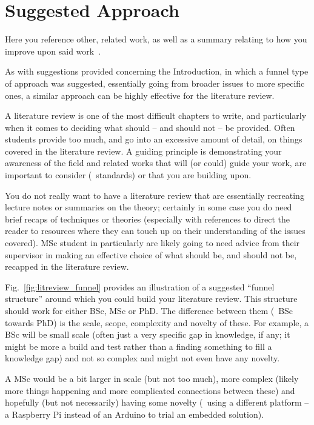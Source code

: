 \label{Ch:LiteratureReview}

\section{Suggested Approach}

Here you reference other, related work, as well as a summary relating to how you improve upon said work~\cite{BibExample}.

As with suggestions provided concerning the Introduction, in which a funnel type of approach was suggested, essentially going from broader issues to more specific ones, a similar approach can be highly effective for the literature review.

A literature review is one of the most difficult chapters to write, and particularly when it comes to deciding what should -- and should not -- be provided. Often students provide too much, and go into an excessive amount of detail, on things covered in the literature review.  A guiding principle is demonstrating your awareness of the field and related works that will (or could) guide your work, are important to consider (\eg~standards) or that you are building upon.

You do not really want to have a literature review that are essentially recreating lecture notes or summaries on the theory; certainly in some case you do need brief recaps of techniques or theories (especially with references to direct the reader to resources where they can touch up on their understanding of the issues covered).  MSc student in particularly are likely going to need advice from their supervisor in making an effective choice of what should be, and should not be, recapped in the literature review.

Fig.~\ref{fig:litreview_funnel} provides an illustration of a suggested ``funnel structure'' around which you could build your literature review.  This structure should work for either BSc, MSc or PhD.  The difference between them (\ie~BSc towards PhD) is the scale, scope, complexity and novelty of these.  For example, a BSc will be small scale (often just a very specific gap in knowledge, if any; it might be more a build and test rather than a finding something to fill a knowledge gap) and not so complex and might not even have any novelty.

A MSc would be a bit larger in scale (but not too much), more complex (likely more things happening and more complicated connections between these) and hopefully (but not necessarily) having some novelty (\eg~using a different platform -- a Raspberry Pi instead of an Arduino to trial an embedded solution).

